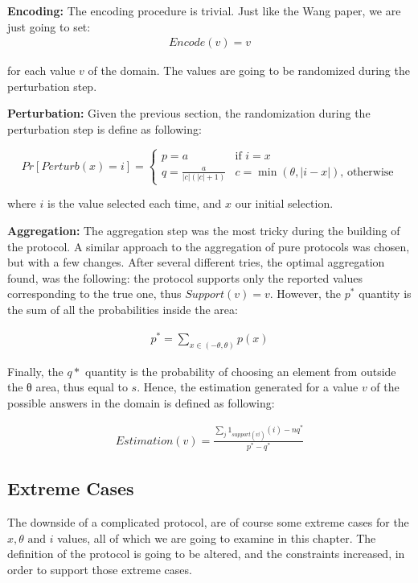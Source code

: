 \textbf{Encoding:} The encoding procedure is trivial. Just like the Wang paper, we are just going to set:
\begin{align*}
    Encode(v) = v
\end{align*}

for each value $v$ of the domain. The values are going to be randomized during the perturbation step.

\textbf{Perturbation:} Given the previous section, the randomization during the perturbation step is define as following:

\begin{equation*}
    Pr[Perturb(x) = i] =
	\begin{cases}
		p = a & \mbox{if } i = x \\
		q = \frac{a}{|c|(|c| + 1)}  &  c = \min{(\theta, |i-x|)}  \mbox{, otherwise}	\end{cases}
\end{equation*}
 
where $i$ is the value selected each time, and $x$ our initial selection. 

\textbf{Aggregation:} The aggregation step was the most tricky during the building of the protocol. A similar approach to the aggregation of pure protocols was chosen, but with a few changes. After several different tries, the optimal aggregation found, was the following: the protocol supports only the reported values corresponding to the true one, thus $Support(v) = v$. However, the $p^*$ quantity is the sum of all the probabilities inside the area: 

\begin{align*}
    p^* = \sum_{x\in (-\theta, \theta)} p(x)
\end{align*}

Finally, the $q*$ quantity is the probability of choosing an element from outside the θ area, thus equal to $s$. Hence, the estimation generated for a value $v$ of the possible answers in the domain is defined as following:

\begin{align*}
    Estimation(v) = \frac{\sum_{j} 1_{support(v^j)}(i) - nq^*}{p^* - q^*}
\end{align*}

\subsection{Extreme Cases}

The downside of a complicated protocol, are of course some extreme cases for the $x, \theta \text{ and } i$ values, all of which we are going to examine in this chapter. The definition of the protocol is going to be altered, and the constraints increased, in order to support those extreme cases.

